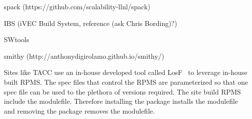 spack (https://github.com/scalability-llnl/spack)

IBS (iVEC Build System, reference (ask Chris Bording)?)

SWtools~\cite{swtools, jones08}

smithy (http://anthonydigirolamo.github.io/smithy/)

Sites like TACC use an in-house developed tool called
LosF~\cite{lmodSC11} to leverage in-house  built RPMS.  The spec files
that control the RPMS are parameterized so that one spec file can be
used to the plethora of versions required.  The site build RPMS
include the modulefile.  Therefore installing the package installs the
modulefile and removing the package removes the modulefile.
